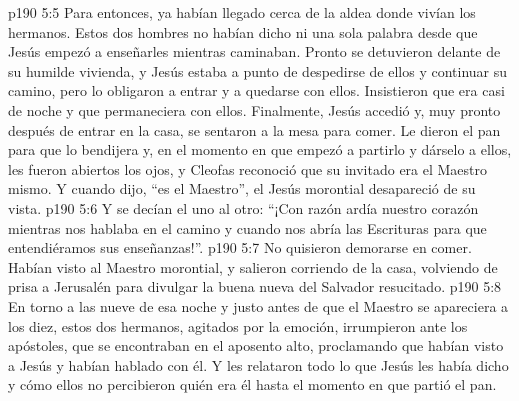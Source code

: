 \vs p190 5:5 Para entonces, ya habían llegado cerca de la aldea donde vivían los hermanos. Estos dos hombres no habían dicho ni una sola palabra desde que Jesús empezó a enseñarles mientras caminaban. Pronto se detuvieron delante de su humilde vivienda, y Jesús estaba a punto de despedirse de ellos y continuar su camino, pero lo obligaron a entrar y a quedarse con ellos. Insistieron que era casi de noche y que permaneciera con ellos. Finalmente, Jesús accedió y, muy pronto después de entrar en la casa, se sentaron a la mesa para comer. Le dieron el pan para que lo bendijera y, en el momento en que empezó a partirlo y dárselo a ellos, les fueron abiertos los ojos, y Cleofas reconoció que su invitado era el Maestro mismo. Y cuando dijo, “es el Maestro”, el Jesús morontial desapareció de su vista.
\vs p190 5:6 Y se decían el uno al otro: “¡Con razón ardía nuestro corazón mientras nos hablaba en el camino y cuando nos abría las Escrituras para que entendiéramos sus enseñanzas!”.
\vs p190 5:7 No quisieron demorarse en comer. Habían visto al Maestro morontial, y salieron corriendo de la casa, volviendo de prisa a Jerusalén para divulgar la buena nueva del Salvador resucitado.
\vs p190 5:8 En torno a las nueve de esa noche y justo antes de que el Maestro se apareciera a los diez, estos dos hermanos, agitados por la emoción, irrumpieron ante los apóstoles, que se encontraban en el aposento alto, proclamando que habían visto a Jesús y habían hablado con él. Y les relataron todo lo que Jesús les había dicho y cómo ellos no percibieron quién era él hasta el momento en que partió el pan.
